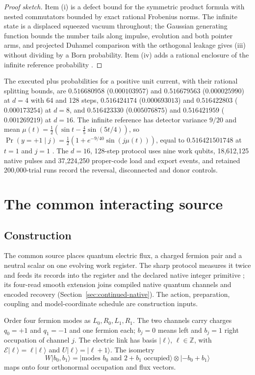 \documentclass[11pt]{article}
\theoremstyle{definition}
\theoremstyle{remark}
\theoremstyle{plain}
\newcommand{\ket}[1]{\lvert #1\rangle}
\newcommand{\Eflux}{\mathcal{E}}
\begin{document}
\begin{proof}[Proof sketch]
Item (i) is a defect bound for the symmetric product formula
\cite{strang1968} with nested commutators bounded by exact rational Frobenius
norms. The infinite state is a displaced squeezed vacuum throughout; the
Gaussian generating function bounds the number tails along impulse,
evolution and both pointer arms, and projected Duhamel comparison with the
orthogonal leakage gives (iii) without dividing by a Born probability. Item
(iv) adds a rational enclosure of the infinite reference probability
\cite{ssDERIV,rSS}.
\end{proof}

The executed plus probabilities for a positive unit current, with their
rational splitting bounds, are $0.516680958$ ($0.000103957$) and
$0.516679563$ ($0.000025990$) at $d=4$ with 64 and 128 steps, $0.516424174$
($0.000693013$) and $0.516422803$ ($0.000173254$) at $d=8$, and $0.516423330$
($0.005076875$) and $0.516421959$ ($0.001269219$) at $d=16$. The infinite
reference has detector variance $9/20$ and mean
$\mu(t)=\frac12(\sin t-\frac45\sin(5t/4))$, so
$\Pr(y=+1\mid j)=\frac12(1+e^{-9/40}\sin(j\mu(t)))$, equal to
$0.516421501748$ at $t=1$ and $j=1$ \cite{ssREADME}. The $d=16$, 128-step
protocol uses nine work qubits, 18,612,125 native pulses and 37,224,250
proper-code load and export events, and retained 200,000-trial runs record
the reversal, disconnected and donor controls.

\section{The common interacting source}
\label{sec:common}

\subsection{Construction}
\label{sec:common-construction}

The common source places quantum electric flux, a charged fermion pair and a
neutral scalar on one evolving work register. The sharp protocol measures it
twice and feeds its records into the register and the declared native
integer primitive \cite{csREADME,csDERIV}; its four-read smooth extension
joins compiled native quantum channels and encoded recovery
(Section~\ref{sec:continued-native}). The action, preparation, coupling and
model-coordinate schedule are construction inputs.

Order four fermion modes as $L_0,R_0,L_1,R_1$. The two channels carry charges
$q_0=+1$ and $q_1=-1$ and one fermion each; $b_j=0$ means left and $b_j=1$
right occupation of channel $j$. The electric link has basis $\ket\ell$,
$\ell\in\mathbb Z$, with $\Eflux\ket\ell=\ell\ket\ell$ and
$U\ket\ell=\ket{\ell+1}$. The isometry
\[
W\ket{b_0,b_1}=\ket{\text{modes }b_0\text{ and }2+b_1\text{ occupied}}\otimes\ket{-b_0+b_1}
\]
maps onto four orthonormal occupation and flux vectors.
\end{document}
